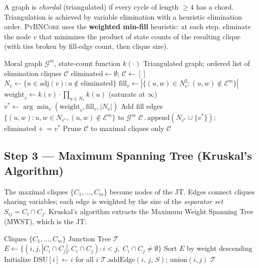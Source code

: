 \documentclass[11pt, letterpaper]{article}
\newcommand{\bncore}{\textsc{PyBNCore}}
\theoremstyle{definitionstyle}
\begin{document}
A graph is \emph{chordal} (triangulated) if every cycle of length
$\geq 4$ has a chord. Triangulation is achieved by variable elimination
with a heuristic elimination order. \bncore{} uses the
\textbf{weighted min-fill} heuristic: at each step, eliminate the node
$v$ that minimizes the product of state counts of the resulting clique
(with ties broken by fill-edge count, then clique size).

\begin{algorithm}[ht]
\caption{Weighted Min-Fill Triangulation}
\label{alg:triangulation}
\begin{algorithmic}[1]
\Require Moral graph $\mathcal{G}^m$, state-count function $k(\cdot)$
\Ensure Triangulated graph; ordered list of elimination cliques $\mathcal{C}$
\State $\text{eliminated} \leftarrow \emptyset$; \quad $\mathcal{C} \leftarrow []$
    \State $N_v \leftarrow \{u \in \text{adj}(v) : u \notin \text{eliminated}\}$
    \State $\text{fill}_v \leftarrow |\{(u,w)\in N_v^2 : (u,w)\notin\mathcal{E}^m\}|$
    \State $\text{weight}_v \leftarrow k(v)\cdot \prod_{u\in N_v} k(u)$ \quad (saturate at $\infty$)
  \EndFor
  \State $v^* \leftarrow \arg\min_v (\text{weight}_v, \text{fill}_v, |N_v|)$
  \State Add fill edges $\{(u,w):u,w\in N_{v^*}, (u,w)\notin\mathcal{E}^m\}$ to $\mathcal{G}^m$
  \State $\mathcal{C}\mathrel{.}\text{append}(N_{v^*}\cup\{v^*\})$; \quad $\text{eliminated}\mathrel{+}=v^*$
\EndFor
\State Prune $\mathcal{C}$ to maximal cliques only
\State \Return $\mathcal{C}$
\end{algorithmic}
\end{algorithm}

\subsection{Step 3 — Maximum Spanning Tree (Kruskal's Algorithm)}

The maximal cliques $\{C_1,\ldots,C_m\}$ become nodes of the JT. Edges
connect cliques sharing variables; each edge is weighted by the size of
the \emph{separator set} $S_{ij} = C_i \cap C_j$. Kruskal's algorithm
extracts the Maximum Weight Spanning Tree (MWST), which is the JT:

\begin{algorithm}[ht]
\caption{Kruskal's MWST for Junction Tree}
\label{alg:kruskal}
\begin{algorithmic}[1]
\Require Cliques $\{C_1,\ldots,C_m\}$
\Ensure Junction Tree $\mathcal{T}$
\State $E \leftarrow \{(i,j, |C_i\cap C_j|, C_i\cap C_j) : i<j,\;C_i\cap C_j\neq\emptyset\}$
\State Sort $E$ by weight descending
\State Initialize $\text{DSU}[i]\leftarrow i$ for all $i$ 
   
    \State $\mathcal{T}.\text{addEdge}(i,\,j,\,S)$; \quad $\text{union}(i,j)$
  \EndIf
\EndFor
\State \Return $\mathcal{T}$
\end{algorithmic}
\end{algorithm}
\end{document}
